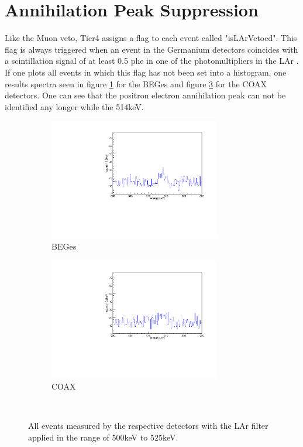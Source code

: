 \documentclass[encoding=utf8,british]{tumphthesis}
\begin{document}
\section{Annihilation Peak Suppression}
\label{sec:APS}

Like the Muon veto, Tier4 assigns a flag to each event called "isLArVetoed".
This flag is always triggered when an event in the Germanium detectors coincides with a scintillation signal of at least 0.5 phe in one of the photomultipliers in the LAr \cite{agostini_background_2017}.
If one plots all events in which this flag has not been set into a histogram, one results spectra seen in figure \ref{fig:LArBEGes} for the BEGes and figure \ref{fig:LArCOAX} for the COAX detectors.
One can see that the positron electron annihilation peak can not be identified any longer while the 514keV.
\\

\begin{figure}[t!]
\centering
\begin{subfigure}{0.5\textwidth}
	\includegraphics[width=75mm]{./Bilder/500525LArVetoBEGes.pdf}
    \caption{BEGes}
  \label{fig:LArBEGes}
\end{subfigure}\hfill%
\begin{subfigure}{0.5\textwidth}
	\includegraphics[width=75mm]{./Bilder/500525LArVetoCOAX.pdf}
  \caption{COAX}
  \label{fig:LArCOAX}
\end{subfigure}
    \\
	\vspace{0.5cm}
    \caption{All events measured by the respective detectors with the LAr filter applied in the range of 500keV to 525keV.}
\end{figure}
\end{document}
